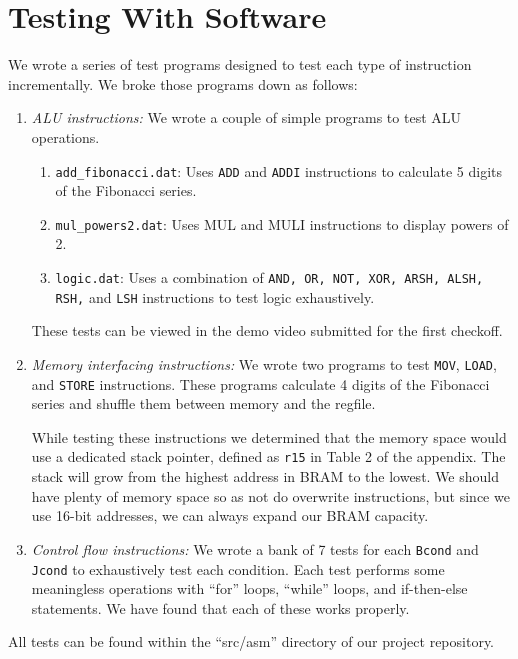\documentclass[conference]{IEEEtran}
\begin{document}
\section{Testing With Software}
We wrote a series of test programs designed to test each type of instruction incrementally. We broke those programs down as follows:
\begin{enumerate}
    \item \textit{ALU instructions:} We wrote a couple of simple programs to test ALU operations.
    \begin{enumerate}
        \item \verb|add_fibonacci.dat|: Uses \verb|ADD| and \verb|ADDI| instructions to calculate 5 digits of the Fibonacci series.
        \item \verb|mul_powers2.dat|: Uses MUL and MULI instructions to display powers of 2.
        \item \verb|logic.dat|: Uses a combination of \verb|AND, OR, NOT, XOR, ARSH, ALSH, RSH,| and \verb|LSH| instructions to test logic exhaustively.
    \end{enumerate}
    These tests can be viewed in the demo video submitted for the first checkoff.
    \item \textit{Memory interfacing instructions:} We wrote two programs to test \verb|MOV|, \verb|LOAD|, and \verb|STORE| instructions. These programs calculate 4 digits of the Fibonacci series and shuffle them between memory and the regfile.

    While testing these instructions we determined that the memory space would use a dedicated stack pointer, defined as \verb|r15| in Table 2 of the appendix. The stack will grow from the highest address in BRAM to the lowest. We should have plenty of memory space so as not do overwrite instructions, but since we use 16-bit addresses, we can always expand our BRAM capacity.
    \item \textit{Control flow instructions:} We wrote a bank of 7 tests for each \verb|Bcond| and \verb|Jcond| to exhaustively test each condition. Each test performs some meaningless operations with ``for'' loops, ``while'' loops, and if-then-else statements. We have found that each of these works properly.
\end{enumerate}
All tests can be found within the ``src/asm'' directory of our project repository.
\end{document}
